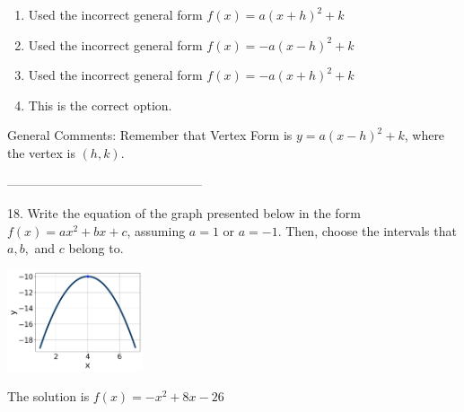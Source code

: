 \documentclass{extbook}[14pt]
\begin{document}
\begin{enumerate}[label=\Alph*.] 
\item Used the incorrect general form $f(x) = a(x+h)^2 + k$  
\item Used the incorrect general form $f(x) = -a(x-h)^2 + k$  
\item Used the incorrect general form $f(x) = -a(x+h)^2 + k$  
\item This is the correct option.  
\end{enumerate} 
 
General Comments: Remember that Vertex Form is $y = a(x-h)^2+k$, where the vertex is $(h, k)$.

-----------------------------------------------

18. Write the equation of the graph presented below in the form $f(x)=ax^2+bx+c$, assuming  $a=1$ or $a=-1$. Then, choose the intervals that $a, b,$ and $c$ belong to.
\begin{center} \includegraphics[width=0.3\textwidth]{../Figures/quadraticGraphToEquationB.png} \end{center} 

The solution is $ f(x) = -x^{2} +8 x -26 $ 
\end{document}
